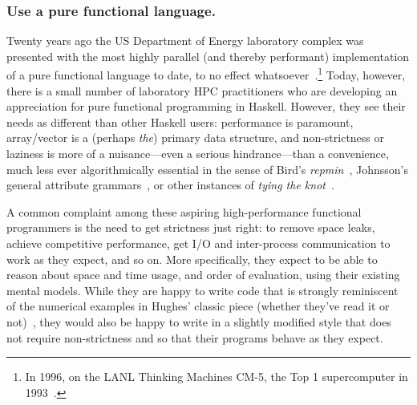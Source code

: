 \documentclass{llncs}
\begin{document}
\subsubsection{Use a pure functional language.}
Twenty years ago the US Department of Energy laboratory complex was
presented with the most highly parallel (and thereby performant)
implementation of a pure functional language to date, to no
effect whatsoever~\cite{Davis96}.\footnote{In 1996, on the LANL Thinking Machines
CM-5, the Top 1 supercomputer in 1993~\cite{top1:1993}.}
Today, however, there is a small number of laboratory HPC practitioners
who are developing an appreciation for pure functional programming in Haskell.
However, they see their needs as different than other Haskell users: performance
is paramount, array/vector
is a (perhaps \emph{the}) primary data
structure, and non-strictness or laziness is more of a nuisance---even a
serious hindrance---than a convenience, much less ever algorithmically
essential in the sense of Bird's \emph{repmin}~\cite{Bird84},
Johnsson's general attribute grammars~\cite{Johnsson87}, 
or other instances of \emph{tying the knot}~\cite{tying-the-knot}.

A common complaint among these aspiring high-performance functional
programmers is the need to get strictness just right: to remove space leaks,
achieve competitive performance, get I/O and inter-process communication to work
as they expect, and so on.  More specifically, they expect to be able to
reason about space and time usage, and order of evaluation, using their
existing mental models. While they are happy to write code that is strongly
reminiscent of the numerical examples in Hughes' classic piece (whether
they've read it or not)~\cite{Hughes89}, they would also be happy to write in
a slightly modified style that does not require non-strictness 
%
and so that their programs behave as they expect.
\end{document}
